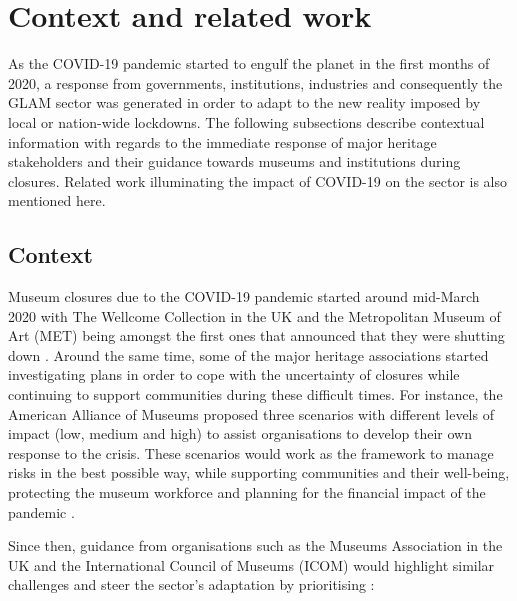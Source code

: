 \documentclass{egpubl}
\begin{document}
\section{Context and related work}
\label{conrel}
As the COVID-19 pandemic started to engulf the planet in the first months of 2020, a response from governments, institutions, industries and consequently the GLAM sector was generated in order to adapt to the new reality imposed by local or nation-wide lockdowns. The following subsections describe contextual information with regards to the immediate response of major heritage stakeholders and their guidance towards museums and institutions during closures. Related work illuminating the impact of COVID-19 on the sector is also mentioned here.

\subsection{Context}
\label{con}
Museum closures due to the COVID-19 pandemic started around mid-March 2020 with The Wellcome Collection in the UK and the Metropolitan Museum of Art (MET) being amongst the first ones that announced that they were shutting down \cite{McGivern2020,KendallAdams2020}. Around the same time, some of the major heritage  associations started investigating plans in order to cope with the uncertainty of closures while continuing to support communities during these difficult times. For instance, the American Alliance of Museums proposed three scenarios with different levels of impact (low, medium and high) to assist organisations to develop their own response to the crisis. These scenarios would work as the framework to manage risks in the best possible way, while supporting communities and their well-being, protecting the museum workforce and planning for the financial impact of the pandemic \cite{Merritt2020}.

Since then, guidance from organisations such as the Museums Association in the UK and the International Council of Museums (ICOM) would highlight similar challenges and steer the sector's adaptation by prioritising \cite{InternationalCouncilofMuseums2020a,Olorunshola2020,MuseumsAssociation2020}:
\end{document}
